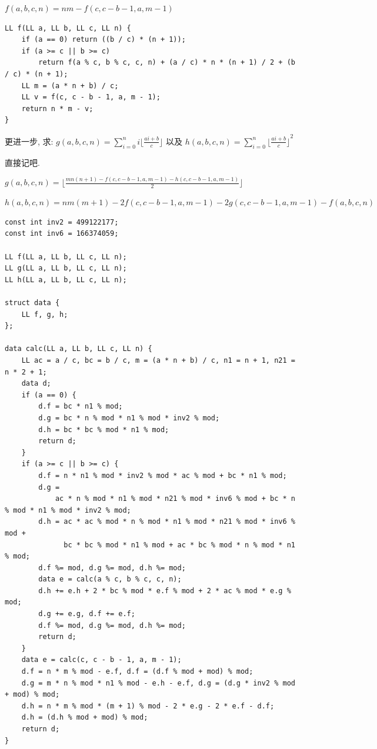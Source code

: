 \documentclass[UTF8, a4paper, titlepage, twoside]{ctexart}
\begin{document}
$f(a, b, c, n) = nm-f(c, c - b - 1, a, m - 1)$

\begin{lstlisting}[style=cpp]
LL f(LL a, LL b, LL c, LL n) {
    if (a == 0) return ((b / c) * (n + 1));
    if (a >= c || b >= c)
        return f(a % c, b % c, c, n) + (a / c) * n * (n + 1) / 2 + (b / c) * (n + 1);
    LL m = (a * n + b) / c;
    LL v = f(c, c - b - 1, a, m - 1);
    return n * m - v;
}
\end{lstlisting}

更进一步, 求: $g(a, b, c, n) = \sum\limits_{i = 0}^{n}i\lfloor{\frac{ai+b}{c}}\rfloor$ 以及 $h(a, b, c, n) = \sum\limits_{i = 0}^{n}{\lfloor{\frac{ai+b}{c}}\rfloor}^2$​

直接记吧.

$g(a, b, c, n) = \lfloor{\frac{mn(n+1)-f(c, c-b-1, a, m-1)-h(c, c-b-1, a, m-1)}{2}}\rfloor$​

$h(a, b, c, n) = nm(m+1)-2f(c, c - b-1, a, m- 1)-2g(c,c-b-1,a,m-1)-f(a, b, c, n)$

\begin{lstlisting}[style=cpp]
const int inv2 = 499122177;
const int inv6 = 166374059;

LL f(LL a, LL b, LL c, LL n);
LL g(LL a, LL b, LL c, LL n);
LL h(LL a, LL b, LL c, LL n);

struct data {
    LL f, g, h;
};

data calc(LL a, LL b, LL c, LL n) {
    LL ac = a / c, bc = b / c, m = (a * n + b) / c, n1 = n + 1, n21 = n * 2 + 1;
    data d;
    if (a == 0) {
        d.f = bc * n1 % mod;
        d.g = bc * n % mod * n1 % mod * inv2 % mod;
        d.h = bc * bc % mod * n1 % mod;
        return d;
    }
    if (a >= c || b >= c) {
        d.f = n * n1 % mod * inv2 % mod * ac % mod + bc * n1 % mod;
        d.g =
            ac * n % mod * n1 % mod * n21 % mod * inv6 % mod + bc * n % mod * n1 % mod * inv2 % mod;
        d.h = ac * ac % mod * n % mod * n1 % mod * n21 % mod * inv6 % mod +
              bc * bc % mod * n1 % mod + ac * bc % mod * n % mod * n1 % mod;
        d.f %= mod, d.g %= mod, d.h %= mod;
        data e = calc(a % c, b % c, c, n);
        d.h += e.h + 2 * bc % mod * e.f % mod + 2 * ac % mod * e.g % mod;
        d.g += e.g, d.f += e.f;
        d.f %= mod, d.g %= mod, d.h %= mod;
        return d;
    }
    data e = calc(c, c - b - 1, a, m - 1);
    d.f = n * m % mod - e.f, d.f = (d.f % mod + mod) % mod;
    d.g = m * n % mod * n1 % mod - e.h - e.f, d.g = (d.g * inv2 % mod + mod) % mod;
    d.h = n * m % mod * (m + 1) % mod - 2 * e.g - 2 * e.f - d.f;
    d.h = (d.h % mod + mod) % mod;
    return d;
}
\end{lstlisting}
\end{document}
